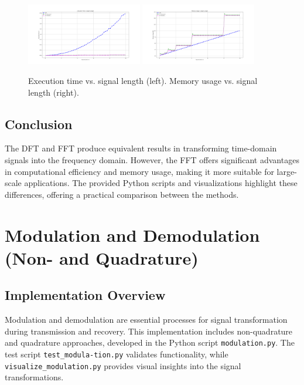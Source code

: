\documentclass[12pt, a4paper]{report}
\begin{document}
\begin{figure}[h!]
	\centering
	\includegraphics[width=0.45\textwidth]{2023_11_29_Bilder_Dokumentation/Execution_Time_vs_Signal_Length.png}
	\hspace{0.05\textwidth}
	\includegraphics[width=0.45\textwidth]{2023_11_29_Bilder_Dokumentation/Memory_Usage_vs_Signal_length.png}
	\caption{Execution time vs. signal length (left). Memory usage vs. signal length (right).}
	\label{fig:scaling_comparison}
\end{figure}

\subsection{Conclusion}
The \ac{DFT} and \ac{FFT} produce equivalent results in transforming time-domain signals into the frequency domain. However, the \ac{FFT} offers significant advantages in computational efficiency and memory usage, making it more suitable for large-scale applications. The provided Python scripts and visualizations highlight these differences, offering a practical comparison between the methods.

\section{Modulation and Demodulation (Non- and Quadrature)}

\subsection{Implementation Overview}

Modulation and demodulation are essential processes for signal transformation during transmission and recovery. This implementation includes non-quadrature and quadrature approaches, developed in the Python script \texttt{modulation.py}. The test script \texttt{test\_modula-\newline tion.py} validates functionality, while \texttt{visualize\_modulation.py} provides visual insights into the signal transformations.
\end{document}
